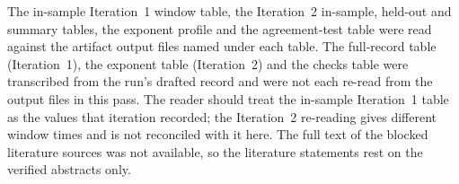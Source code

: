 \documentclass[11pt,letterpaper]{article}
\begin{document}
The in-sample Iteration~1 window table, the Iteration~2 in-sample, held-out and summary tables, the exponent profile and the agreement-test table were read against the artifact output files named under each table. The full-record table (Iteration~1), the exponent table (Iteration~2) and the checks table were transcribed from the run's drafted record and were not each re-read from the output files in this pass. The reader should treat the in-sample Iteration~1 table as the values that iteration recorded; the Iteration~2 re-reading gives different window times and is not reconciled with it here. The full text of the blocked literature sources was not available, so the literature statements rest on the verified abstracts only.
\end{document}
